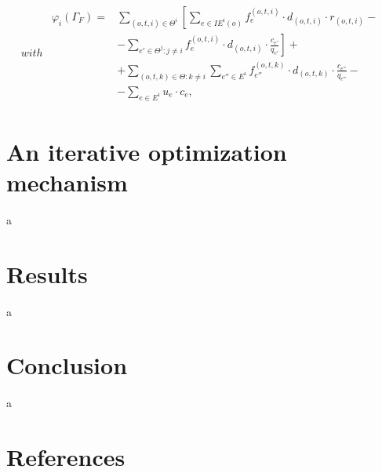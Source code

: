 \documentclass[review]{elsarticle}
\begin{document}
\begin{subequations}
with 
    \begin{align}
        \begin{split}
        \varphi_i(\Gamma_F) = & \sum_{(o,t,i)\in \Theta^i} \left[ \sum_{e \in IE^i(o)} f_e^{(o,t,i)} \cdot d_{(o,t,i)} \cdot r_{(o,t,i)} - \right. \\
                              & \left. - \sum_{e'\in \Theta^j \colon j\not = i} f_e^{(o,t,i)} \cdot d_{(o,t,i)} \cdot \frac{c_{e'}}{q_{e'}} \right] + \\
                              & + \sum_{(o,t,k) \in \Theta \colon k \not = i} \sum_{e'' \in E^i} f_{e''}^{(o,t,k)} \cdot d_{(o,t,k)} \cdot \frac{c_{e''}}{q_{e''}} -\\
                              & - \sum_{e \in E^i} u_e \cdot c_e,
        \end{split}
    \end{align}
\end{subequations}

\section{An iterative optimization mechanism}
a
\section{Results}
a
\section{Conclusion}
a
\section*{References}


\end{document}
